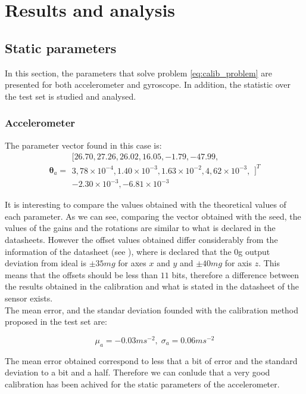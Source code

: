 \documentclass[conference]{IEEEtran}
\begin{document}
\section{Results and analysis}
\subsection{Static parameters}
In this section, the parameters that solve problem \ref{eq:calib_problem} are presented for both accelerometer and gyroscope. In addition, the statistic over the test set is studied and analysed. \\

\subsubsection{Accelerometer}
The parameter vector found in this case is:
\begin{equation}
\boldsymbol{\theta}_a = \begin{array}{c}
[26.70, 27.26, 26.02, 16.05, -1.79, -47.99,\\
 3,78\times 10^{-4}, 1.40\times 10^{-3}, 1.63 \times 10^{-2},  4,62 \times 10^{-3},\\ -2.30\times 10^{-3}, -6.81 \times 10^{-3}
\end{array}]^T
\end{equation}

It is interesting to compare the values obtained with the theoretical values of each parameter. As we can see, comparing the vector obtained with the seed, the values of the gains and the rotations are similar to what is declared in the datasheets. However the offset values obtained differ considerably from the information of the datasheet (see \cite{bib:acc_data}), where is declared that the 0g output deviation from ideal is $\pm 35 mg$ for axes $x$ and $y$ and $\pm 40mg$ for axis $z$. This means that the offsets should be less than $11$ bits, therefore a difference between the results obtained in the calibration and what is stated in the datasheet of the sensor exists.\\

The mean error, and the standar deviation founded with the calibration method proposed in the test set are:

\begin{equation}
\mu_a = -0.03ms^{-2}, \; \sigma_a = 0.06ms^{-2}
\end{equation}

The mean error obtained correspond to less that a bit of error and the standard deviation to a bit and a half. Therefore we can conlude that a very good calibration has been achived for the static parameters of the accelerometer.\\
\end{document}
